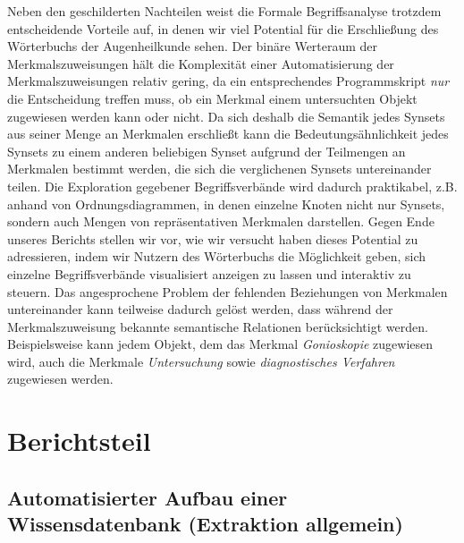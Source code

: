 \documentclass[pagesize,DIV=calc,12pt,draft]{scrreprt}
\begin{document}
Neben den geschilderten Nachteilen weist die Formale Begriffsanalyse trotzdem entscheidende Vorteile auf, in denen wir viel Potential für die Erschließung des Wörterbuchs der Augenheilkunde sehen. 
Der binäre Werteraum der Merkmalszuweisungen hält die Komplexität einer Automatisierung der Merkmalszuweisungen relativ gering, da ein entsprechendes Programmskript \emph{nur} die Entscheidung treffen muss, ob ein Merkmal einem untersuchten Objekt zugewiesen werden kann oder nicht. 
Da sich deshalb die Semantik jedes Synsets aus seiner Menge an Merkmalen erschließt kann die Bedeutungsähnlichkeit jedes Synsets zu einem anderen beliebigen Synset aufgrund der Teilmengen an Merkmalen bestimmt werden, die sich die verglichenen Synsets untereinander teilen. 
Die Exploration gegebener Begriffsverbände wird dadurch praktikabel, z.B. 
anhand von Ordnungsdiagrammen, in denen einzelne Knoten nicht nur Synsets, sondern auch Mengen von repräsentativen Merkmalen darstellen. 
Gegen Ende unseres Berichts stellen wir vor, wie wir versucht haben dieses Potential zu adressieren, indem wir Nutzern des Wörterbuchs die Möglichkeit geben, sich einzelne Begriffsverbände visualisiert anzeigen zu lassen und interaktiv zu steuern. 
Das angesprochene Problem der fehlenden Beziehungen von Merkmalen untereinander kann teilweise dadurch gelöst werden, dass während der Merkmalszuweisung bekannte semantische Relationen berücksichtigt werden. 
Beispielsweise kann jedem Objekt, dem das Merkmal \emph{Gonioskopie} zugewiesen wird, auch die Merkmale \emph{Untersuchung} sowie \emph{diagnostisches Verfahren} zugewiesen werden. 

\chapter{Berichtsteil}

\section{Automatisierter Aufbau einer Wissensdatenbank (Extraktion allgemein)}
\end{document}
